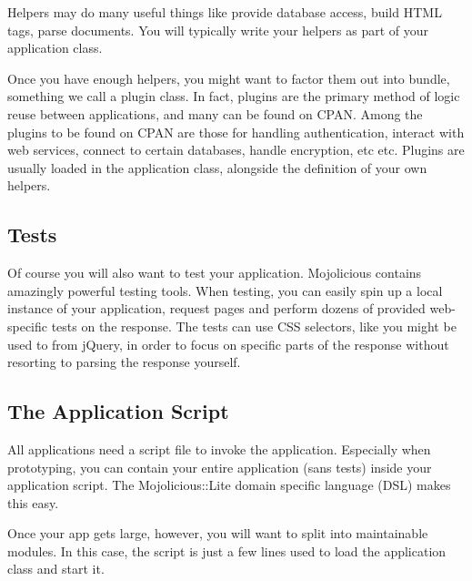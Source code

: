 Helpers may do many useful things like provide database access, build HTML tags, parse documents.
You will typically write your helpers as part of your application class.

Once you have enough helpers, you might want to factor them out into bundle, something we call a plugin class.
In fact, plugins are the primary method of logic reuse between applications, and many can be found on CPAN.
Among the plugins to be found on CPAN are those for handling authentication, interact with web services, connect to certain databases, handle encryption, etc etc.
Plugins are usually loaded in the application class, alongside the definition of your own helpers.

\subsection{Tests}

Of course you will also want to test your application.
Mojolicious contains amazingly powerful testing tools.
When testing, you can easily spin up a local instance of your application, request pages and perform dozens of provided web-specific tests on the response.
The tests can use CSS selectors, like you might be used to from jQuery, in order to focus on specific parts of the response without resorting to parsing the response yourself.

\subsection{The Application Script}

All applications need a script file to invoke the application.
Especially when prototyping, you can contain your entire application (sans tests) inside your application script.
The Mojolicious::Lite domain specific language (DSL) makes this easy.

Once your app gets large, however, you will want to split into maintainable modules.
In this case, the script is just a few lines used to load the application class and start it.
